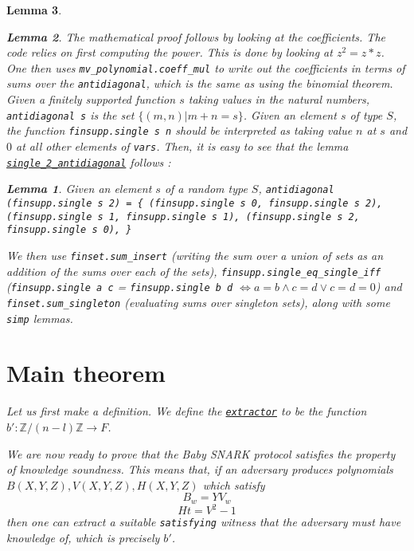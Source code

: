 \documentclass{article}
\newtheorem{lemma}{Lemma}
\theoremstyle{definition}
\theoremstyle{remark}
\begin{document}
\begin{lemma}
\begin{lemma}
The mathematical proof follows by looking at the coefficients. The code relies on first computing the power. This is done by looking at $z^2 = z * z$. One then uses 
\texttt{mv\_polynomial.coeff\_mul} to write out the coefficients in terms of sums over the \texttt{antidiagonal}, which is the same as using the binomial theorem. Given a 
finitely supported function $s$ taking values in the natural numbers, \texttt{antidiagonal s} is the set $\{ (m, n) | m + n = s \}$. Given an element $s$ of type $S$, 
the function \texttt{finsupp.single s n} should be interpreted as taking value $n$ at $s$ and $0$ at all other elements of \texttt{vars}. Then, it is easy to see that the lemma 
\href{https://github.com/BoltonBailey/formal-snarks-project/blob/7fd9cd122f5887f88f6a706b4f2a68a7153c7381/src/general_lemmas/single_antidiagonal.lean#L230}{\texttt{single\_2\_antidiagonal}} follows :
\theoremstyle{lemma}
\begin{lemma}
  Given an element $s$ of a random type $S$, 
  \newline \texttt{antidiagonal (finsupp.single s 2) = 
\{
  (finsupp.single s 0, finsupp.single s 2), 
  (finsupp.single s 1, finsupp.single s 1), 
  (finsupp.single s 2, finsupp.single s 0), 
\} }

\end{lemma}
We then use \texttt{finset.sum\_insert} (writing the sum over a union of sets as an addition of the sums over each of the sets), \texttt{finsupp.single\_eq\_single\_iff} 
(\texttt{finsupp.single a c} = \texttt{finsupp.single b d} $\iff a = b \wedge c = d \vee c = d = 0$) and \texttt{finset.sum\_singleton} (evaluating sums over singleton sets), along with some \texttt{simp} lemmas.

\section{Main theorem}
Let us first make a definition. We define the \href{https://github.com/BoltonBailey/formal-snarks-project/blob/7fd9cd122f5887f88f6a706b4f2a68a7153c7381/src/snarks/babysnark/knowledge_soundness.lean#L346}{\texttt{extractor}} 
to be the function $b' : \mathbb{Z}/(n - l) \mathbb{Z} \to F$.

We are now ready to prove that the Baby SNARK protocol satisfies the property of knowledge soundness. This means that, if an adversary produces polynomials 
$B(X, Y, Z), V(X, Y, Z), H(X, Y, Z)$ which satisfy 
\begin{equation}
  \label{1} B_w = YV_w
\end{equation}
\begin{equation}
  \label{2} Ht = V^2 - 1  
\end{equation}
then one can extract a suitable \texttt{satisfying} witness that the adversary must have knowledge of, which is precisely $b'$.


\end{lemma}
\end{lemma}
\end{document}
